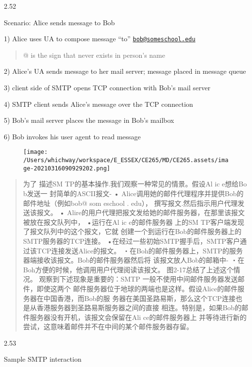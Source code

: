 \documentclass[
]{article}
\begin{document}
2.52

Scenario: Alice sends message to Bob

1) Alice uses UA to compose message ``to''
\href{mailto:bob@someschool.edu}{\nolinkurl{bob@someschool.edu}}

\begin{quote}
@ is the sign that never exists in person's name
\end{quote}

2) Alice's UA sends message to her mail server; message placed in
message queue

3) client side of SMTP opens TCP connection with Bob's mail server

4) SMTP client sends Alice's message over the TCP connection

5) Bob's mail server places the message in Bob's mailbox

6) Bob invokes his user agent to read message

\begin{figure}
\centering
\texttt{[image: /Users/whichway/workspace/E\_ESSEX/CE265/MD/CE265.assets/image-20210316090929202.png]}
\caption{}
\end{figure}

\begin{quote}
为了 描述SM TP的基本操作.我们观察一种常见的情景。假设Al ic e想给Bo
b发送一 封简单的ASCII报文- •
Alice调用她的邮件代理程序并提供Bob的邮件地址（例如bob@ som eschool .
edu）， 撰写报文.然后指示用户代理发送该报文。 •
Alire的用户代理把报文发给她的邮件服务器，在那里该报文被放在报文队列中，
•运行在Al ic e的邮件服务器 上的SM
TP客户端发现了报文队列中的这个报文，它就
创建一个到运行在Bob的邮件服务器上的SMTP服务器的TCP连接。
•在经过一些初始SMTP握手后，SMTP客户通过该TCP连接发送Alice的报文。
・在Boh的邮件服务器上，SMTP的服务器端接收该报文。Bob的邮件服务器然后将
该报文放人Bob的邮箱中- ・在Boh方便的时候，他调用用户代理阅读该报文。
图2-17总结了上述这个情况。 观察到下述现象是重要的：SMTP
一般不使用中间邮件服务器发送邮件，即使这两个
邮件服务器位于地球的两端也是这样。假设Alice的邮件服务器在中国香港，而Bob的服
务器在美国圣路易斯，那么这个TCP连接也是从香港服务器到圣路易斯服务器之间的直接
相连。特别是，如果Bob的邮件服务器没有开机，该报文会保留在Ali
ce的邮件服务器上
并等待进行新的尝试，这意味着邮件并不在中间的某个邮件服务器存留。
\end{quote}

2.53

Sample SMTP interaction
\end{document}

